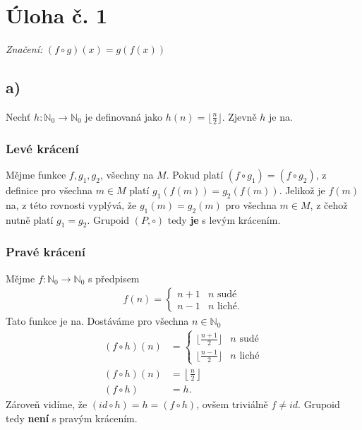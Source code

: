 \documentclass{scrartcl}
\begin{document}
    \section*{Úloha č. 1}
    \textit{Značení: } $(f \circ g)(x) = g(f(x))$
    \subsection*{a)}
    Nechť $h: \mathbb{N}_0 \rightarrow \mathbb{N}_0$ je definovaná jako $h(n) = \lfloor \frac{n}{2} \rfloor$. Zjevně $h$ je na.

    \subsubsection*{Levé krácení}
    Mějme funkce $f,g_1,g_2$, všechny na $M$. Pokud platí $(f \circ g_1) = (f \circ g_2)$, z definice pro všechna $m \in M$ platí $g_1(f(m)) = g_2(f(m))$. Jelikož je $f(m)$ na, z této rovnosti vyplývá, že $g_1(m) = g_2(m)$ pro všechna $m \in M$, z čehož nutně platí $g_1 = g_2$. Grupoid $(P,\circ)$ tedy \textbf{je} s levým krácením.

    \subsubsection*{Pravé krácení} 
    Mějme $f: \mathbb{N}_0 \rightarrow \mathbb{N}_0$ s předpisem
    \begin{align*}
        f(n) =
        \begin{cases}
            n+1 & n\text{ sudé} \\
            n-1 & n\text{ liché}.
        \end{cases} 
    \end{align*}
    Tato funkce je na. Dostáváme pro všechna $n \in \mathbb{N}_0$
    \begin{align*}
        (f \circ h)(n) &=
        \begin{cases}
            \lfloor \frac{n+1}{2} \rfloor & n \text{ sudé}\\
            \lfloor \frac{n-1}{2} \rfloor & n \text{ liché}
        \end{cases} \\
        (f \circ h)(n) &= \left\lfloor \frac{n}{2} \right\rfloor \\
        (f \circ h) &= h.
    \end{align*}
    Zároveň vidíme, že $(id \circ h) = h = (f \circ h)$, ovšem triviálně $f \neq id$. Grupoid tedy \textbf{není} s pravým krácením.
\end{document}
